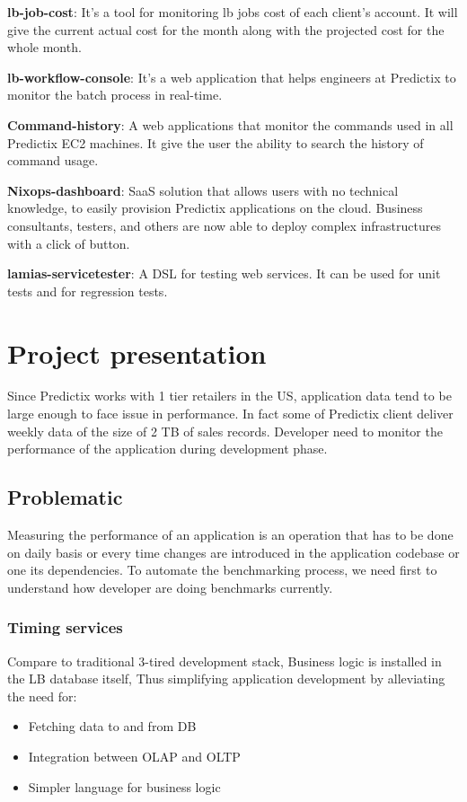 \textbf{lb-job-cost}: It's a tool for monitoring lb jobs cost of each client's account.
It will give the current actual cost for the month along with the projected cost
for the whole month.

\textbf{lb-workflow-console}: It's a web application that helps engineers at Predictix to monitor
the batch process in real-time.

\textbf{Command-history}: A web applications that monitor the commands used in all
Predictix EC2 machines. It give the user the ability to search the history of command
usage.

\textbf{Nixops-dashboard}:
SaaS solution that allows users with no technical knowledge, to easily provision
Predictix applications on the cloud.  Business consultants, testers, and others are
now able to deploy complex infrastructures with a click of button.

\textbf{lamias-servicetester}: A DSL for testing web services. It can be used for unit
tests and for regression tests.

\section{Project presentation}

Since Predictix works with 1 tier retailers in the US, application data tend to
be large enough to face issue in performance. In fact some of Predictix client
deliver weekly data of the size of 2 TB of sales records. 
Developer need to monitor the performance of the application during development
phase.

\subsection{Problematic}
Measuring the performance of an application is an operation that has to be done on
daily basis or every time changes are introduced in the application codebase or
one its dependencies.
To automate the benchmarking process, we need first to understand how developer
are doing benchmarks currently.

\subsubsection{Timing services}
Compare to traditional 3-tired development stack, Business logic is installed in
the LB database itself, Thus simplifying  application development by alleviating
the need for:
\begin{itemize}
\item{Fetching data to and from DB }
\item{Integration between OLAP and OLTP}
\item{Simpler language for business logic}
\end{itemize}

